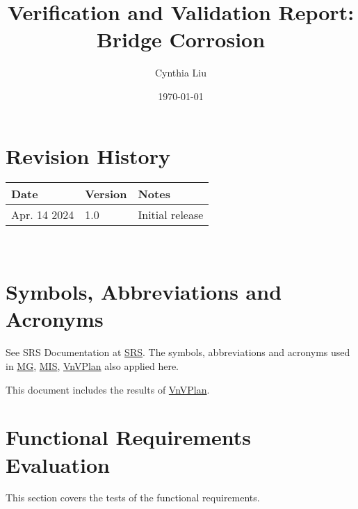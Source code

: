 \documentclass[12pt, titlepage]{article}
\begin{document}
\title{Verification and Validation Report: Bridge Corrosion} 
\author{Cynthia Liu}
\date{\today}
	
\maketitle


\section{Revision History}

\begin{tabularx}{\textwidth}{p{3cm}p{2cm}X}
\toprule {\bf Date} & {\bf Version} & {\bf Notes}\\
\midrule
Apr. 14 2024 & 1.0 & Initial release\\
\bottomrule
\end{tabularx}

~\newpage

\section{Symbols, Abbreviations and Acronyms}
See SRS Documentation at \href{https://github.com/CynthiaLiu0805/BridgeCorrosion/blob/main/docs/SRS/SRS.pdf}{SRS}.
The symbols, abbreviations and acronyms used in \href{https://github.com/CynthiaLiu0805/BridgeCorrosion/blob/main/docs/Design/SoftArchitecture/MG.pdf}{MG}, \href{https://github.com/CynthiaLiu0805/BridgeCorrosion/blob/main/docs/Design/SoftDetailedDes/MIS.pdf}{MIS}, \href{https://github.com/CynthiaLiu0805/BridgeCorrosion/blob/main/docs/VnVPlan/VnVPlan.pdf}{VnVPlan} also applied here.



\newpage

\tableofcontents

\listoftables %


\newpage


This document includes the results of \href{https://github.com/CynthiaLiu0805/BridgeCorrosion/blob/main/docs/VnVPlan/VnVPlan.pdf}{VnVPlan}. 

\section{Functional Requirements Evaluation}\label{FRE}
This section covers the tests of the functional requirements.
\end{document}
